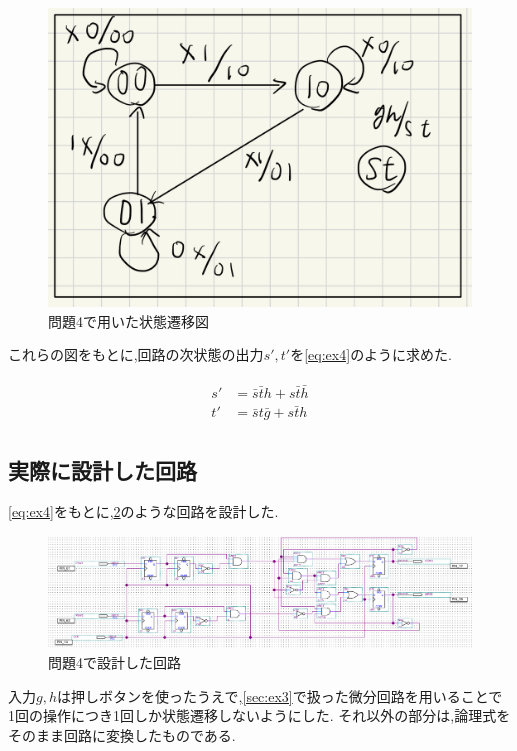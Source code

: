 \documentclass[autodetect-engine, dvi=dvipdfmx, 10pt, a4paper, ja=standard]{bxjsarticle}
\begin{document}
\begin{figure}[H]
	\centering
	\includegraphics[width=0.8\columnwidth]{asset/ex4_state.png}
	\caption{問題4で用いた状態遷移図}
	\label{fig:ex4-state}
\end{figure}

これらの図をもとに,回路の次状態の出力$s', t'$を\ref{eq:ex4}のように求めた.

\begin{align}
	\label{eq:ex4}
	\begin{split}
		s' & = \bar{s} \bar{t} h + s \bar{t} \bar{h} \\
		t' & = \bar{s} t \bar{g} + s \bar{t} h
	\end{split}
\end{align}

\subsection{実際に設計した回路}

\ref{eq:ex4}をもとに,\ref{fig:ex4}のような回路を設計した.

\begin{figure}[H]
	\centering
	\includegraphics[width=\columnwidth]{asset/ex4.png}
	\caption{問題4で設計した回路}
	\label{fig:ex4}
\end{figure}

入力$g, h$は押しボタンを使ったうえで,\ref{sec:ex3}で扱った微分回路を用いることで
1回の操作につき1回しか状態遷移しないようにした.
それ以外の部分は,論理式をそのまま回路に変換したものである.
\end{document}
